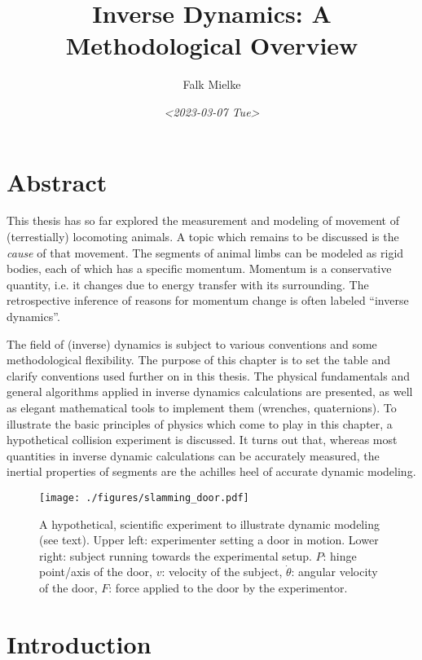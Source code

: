 \documentclass[10pt,a4paper]{article}
\author{Falk Mielke}
\date{\textit{<2023-03-07 Tue>}}
\title{Inverse Dynamics: A Methodological Overview}
\begin{document}
\maketitle
\tableofcontents

\clearpage


\section{Abstract}
\label{sec:org1d7df80}
This thesis has so far explored the measurement and modeling of movement of (terrestially) locomoting animals.
A topic which remains to be discussed is the \emph{cause} of that movement.
The segments of animal limbs can be modeled as rigid bodies, each of which has a specific momentum.
Momentum is a conservative quantity, i.e. it changes due to energy transfer with its surrounding.
The retrospective inference of reasons for momentum change is often labeled ``inverse dynamics''.

The field of (inverse) dynamics is subject to various conventions and some methodological flexibility.
The purpose of this chapter is to set the table and clarify conventions used further on in this thesis.
The physical fundamentals and general algorithms applied in inverse dynamics calculations are presented, as well as elegant mathematical tools to implement them (wrenches, quaternions).
To illustrate the basic principles of physics which come to play in this chapter, a hypothetical collision experiment is discussed.
It turns out that, whereas most quantities in inverse dynamic calculations can be accurately measured, the inertial properties of segments are the achilles heel of accurate dynamic modeling.



\begin{figure}[p]
\centering
\texttt{[image: ./figures/slamming\_door.pdf]}
\caption{\label{fig:slamming}A hypothetical, scientific experiment to illustrate dynamic modeling (see text). Upper left: experimenter setting a door in motion. Lower right: subject running towards the experimental setup. \(P\): hinge point/axis of the door, \(v\): velocity of the subject, \(\dot\theta\): angular velocity of the door, \(F\): force applied to the door by the experimentor.}
\end{figure}


\FloatBarrier\clearpage
\section{Introduction}
\label{sec:orge9d2671}
\end{document}
